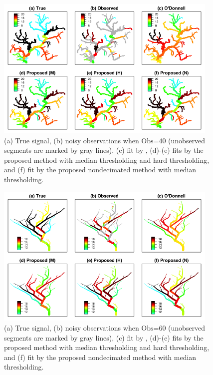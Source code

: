 \documentclass[11pt,titlepage]{article}
\begin{document}
\begin{figure}
	\centering\includegraphics[width=0.95\textwidth]{Stream_Result/SLifting_Comp_02.png}
	\vspace{-4mm}\caption{(a) True signal, (b) noisy observations when $\text{Obs=40}$ (unobserved segments are marked by gray lines), (c) fit by \cite{ODonnell2014}, (d)-(e) fits by the proposed method with median thresholding and hard thresholding, and (f) fit by the proposed nondecimated method with median thresholding.}
	\label{fig:streamsimresult}
\end{figure}


\begin{figure}
	\centering\includegraphics[width=0.95\textwidth]{Stream_Result/SLifting_Comp_03.png}
	\vspace{-4mm}\caption{(a) True signal, (b) noisy observations when $\text{Obs=60}$ (unobserved segments are marked by gray lines), (c) fit by \cite{ODonnell2014}, (d)-(e) fits by the proposed method with median thresholding and hard thresholding, and (f) fit by the proposed nondecimated method with median thresholding.}
	\label{fig:streamsimresult2}
\end{figure}
\end{document}
